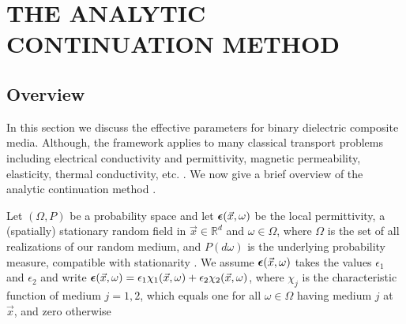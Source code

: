 \documentclass[english,12pt]{ttuthes}
\newcommand\beps{\mbox{\boldmath${\epsilon}$}}
\begin{document}
\chapter{THE ANALYTIC CONTINUATION METHOD}
\label{ch:The_Analytic_Cont_Meth}

\section{Overview}
\label{sec:Background_TACM}

% 
In this section we discuss the effective parameters for binary
dielectric composite media. Although, the framework applies to many
classical transport problems including electrical conductivity and
permittivity, magnetic permeability, elasticity, thermal conductivity,
etc. \cite{MILTON:2002:TC}. We now give a brief overview of the
analytic continuation method
\cite{Bergman:PRL-1285,Milton:APL-300,Golden:CMP-473}.   
 
Let $(\Omega,P)$ be a probability space and let $\beps(\vec{x},\omega)$ be
the local permittivity, a (spatially) stationary random field in
$\vec{x}\in \mathbb{R}^d$ and $\omega \in \Omega$, where $\Omega$ is the set of all
realizations of our random medium, and $P(d\omega)$ is the underlying
probability measure, compatible with stationarity
\cite{Golden:CMP-473}. We assume $\beps(\vec{x},\omega)$ takes the
values $\epsilon_1$ and $\epsilon_2$ and write $\beps(\vec{x},\omega) = \epsilon_1 \chi_1
(\vec{x},\omega) + \epsilon_2 \chi_2(\vec{x},\omega)$, where $\chi_j$ is the
characteristic function of medium $j=1,2$, which equals one for all $\omega
\in \Omega$ having medium $j$ at $\vec{x}$, and zero otherwise
\cite{Golden:CMP-473}  
\end{document}
